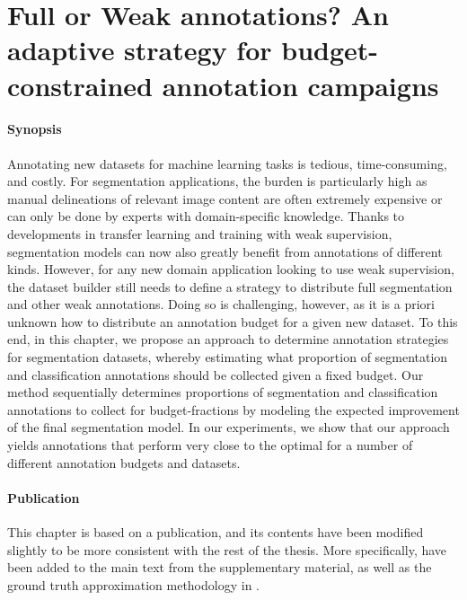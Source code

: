\graphicspath{{ch4_fullweak/}{Figures/}}

\chapter[Full or Weak annotations?]{Full or Weak annotations? An adaptive strategy for budget-constrained annotation campaigns}
\label{chapter:fullweak}


\subsubsection{Synopsis}Annotating new datasets for machine learning tasks is tedious, time-consuming, and costly. For segmentation applications, the burden is particularly high as manual delineations of relevant image content are often extremely expensive or can only be done by experts with domain-specific knowledge. Thanks to developments in transfer learning and training with weak supervision, segmentation models can now also greatly benefit from annotations of different kinds. However, for any new domain application looking to use weak supervision, the dataset builder still needs to define a strategy to distribute full segmentation and other weak annotations. Doing so is challenging, however, as it is a priori unknown how to distribute an annotation budget for a given new dataset. To this end, in this chapter, we propose an approach to determine annotation strategies for segmentation datasets, whereby estimating what proportion of segmentation and classification annotations should be collected given a fixed budget. Our method sequentially determines proportions of segmentation and classification annotations to collect for budget-fractions by modeling the expected improvement of the final segmentation model. In our experiments, we show that our approach yields annotations that perform very close to the optimal for a number of different annotation budgets and datasets.

\subsubsection{Publication}This chapter is based on a publication, and its contents have been modified slightly to be more consistent with the rest of the thesis. More specifically,  have been added to the main text from the supplementary material, as well as the ground truth approximation methodology in .

